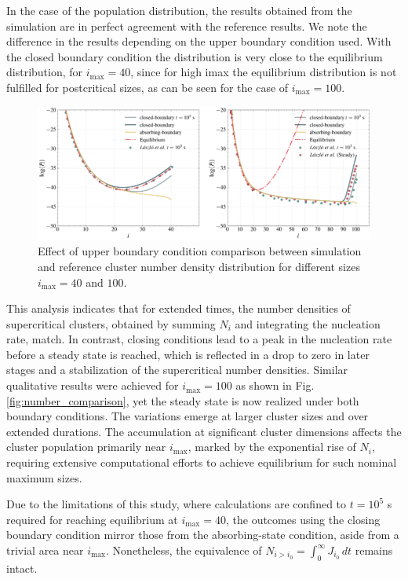 In the case of the population distribution, the results obtained from the simulation are in perfect agreement with the reference results. 
We note the difference in the results depending on the upper boundary condition used. With the closed boundary condition the distribution is very close to the 
equilibrium distribution, for $i_{\text{max}} = 40$, since for high imax the equilibrium distribution is not fulfilled for postcritical sizes, 
as can be seen for the case of $i_{\text{max}} = 100$. 
\begin{figure}[H]
    \centering
    \hspace*{-2cm} %
    \includegraphics[width=1.2\linewidth]{laszlo_results/number_distribution.png}
    \caption{Effect of upper boundary condition comparison between simulation and reference cluster number density distribution for different sizes $i_{\text{max}} = 40$ and $100$.}
    \label{fig:number_distribution}
\end{figure}

This analysis indicates that for extended times, the number densities of supercritical clusters, obtained by summing $N_i$ and integrating the nucleation rate, match. 
In contrast, closing conditions lead to a peak in the nucleation rate before a steady state is reached, which is reflected in a drop to zero in later stages and a 
stabilization of the supercritical number densities.
Similar qualitative results were achieved for $i_{\max} = 100$ as shown in Fig. \ref{fig:number_comparison}, yet the steady state is now realized under both boundary conditions. 
The variations emerge at larger cluster sizes and over extended durations. The accumulation at significant cluster dimensions affects the cluster population primarily 
near $i_{\max}$, marked by the exponential rise of $N_i$, requiring extensive computational efforts to achieve equilibrium for such nominal maximum sizes.

Due to the limitations of this study, where calculations are confined to $t = 10^5$ s required for reaching 
equilibrium at $i_{\max}=40$, the outcomes using the 
closing boundary condition mirror those from the absorbing-state condition, aside from a trivial area near $i_{\max}$. Nonetheless, the equivalence 
of $ N_{i > i_0} = \int_{0}^{\infty} J_{i_0} \, dt$ remains intact.


